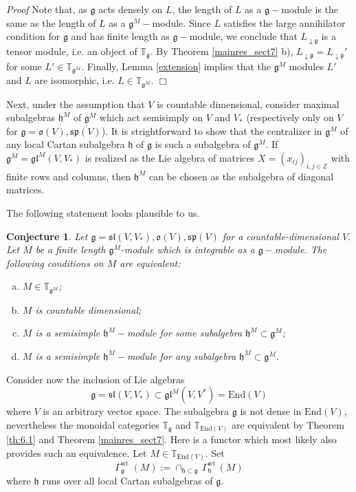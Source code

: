 \documentclass{svmult}
\newtheorem{conject}[theo]{Conjecture}
\renewenvironment{proof}{ \emph{Proof}}{$\Box$}
\newcommand {\ZZ} {\mathbb {Z}}
\newcommand{\TT}{\mathbb{T}}
\newcommand{\wt}{\mathrm{wt}}
\renewcommand{\sp}{\mathfrak{sp}}
\renewcommand{\sl}{\mathfrak{sl}}
\newcommand{\oo}{\mathfrak{o}}
\newcommand{\hh}{\mathfrak{h}}
\renewcommand{\gg}{\mathfrak{g}}
\newcommand{\gl}{\mathfrak{gl}}
\newcommand{\End}{\mathrm{End}}
\begin{document}
\begin{proof}
Note that, as $\gg$ acts densely on $L$, the length of $L$ as a $\gg-$module is the same as the length of $L$ as a $\gg^M-$module. 
Since $L$ satisfies  the large annihilator condition for $\gg$ and has finite length as $\gg-$module, we conclude that $L_{\downarrow\gg}$ is a tensor module, i.e. 
an object of $\TT_\gg$. By Theorem \ref{mainres_sect7} b), $L_{\downarrow\gg} = L_{\downarrow\gg}'$ for some $L' \in \TT_{\gg^M}$. Finally, Lemma \ref{extension} implies that the $\gg^M$ modules $L'$ and $L$ are isomorphic, i.e. $L\in\TT_{\gg^M}$.
\end{proof}
\vspace{0.33cm}

Next, under the assumption that $V$ is countable dimensional, consider maximal subalgebras $\hh^M$ of $\gg^M$ which act semisimply on $V$ and $V_*$ (respectively only on $V$ for $\gg = \oo(V), \sp(V)$). 
It is strightforward to show that the centralizer in $\gg^M$ of any local Cartan subalgebra $\hh$ of $\gg$ is such a subalgebra of $\gg^M$. 
If $\gg^M = \gl^M(V,V_*)$ is realized as the Lie algebra of matrices $X = (x_{ij})_{i,j \in \ZZ}$ with finite rows and columns, then $\hh^M$ can 
be chosen as the subalgebra of diagonal matrices.

The following statement looks plausible to us.

\begin{conject}\label{conject:1}
Let $\gg = \sl(V,V_*), \oo(V), \sp(V)$ for a countable-dimensional $V$. Let $M$ be a finite length $\gg^M$-module which is integrable as a $\gg-$module. The following conditions on $M$ are equivalent:
\begin{enumerate}[a)]
 \item $M \in \TT_{\gg^M}$;
 \item $M$ is countable dimensional;
 \item $M$ is a semisimple $\hh^M-$module for some subalgebra $\hh^M\subset \gg^M$;
  \item $M$ is a semisimple $\hh^M-$module for any subalgebra $\hh^M \subset \gg^M$.
\end{enumerate}

\end{conject} 

\vspace{0.4cm}

Consider now the inclusion of Lie algebras 
$$\gg = \sl(V,V_*) \subset \gl^M(V,V^*) = \End(V)$$
where $V$ is an arbitrary vector space. The subalgebra $\gg$ is not dense in $\End(V)$, nevertheless the monoidal categories $\TT_{\gg}$ and $\TT_{\End(V)}$ are equivalent by Theorem \ref{th:6.1} and Theorem \ref{mainres_sect7}. Here is a functor which most likely also provides such an equivalence. Let $M \in \TT_{\End(V)}$. Set 
$$\Gamma_{\gg}^\wt \;(M) := \cap_{\hh \subset \gg}\,\Gamma_{\hh}^\wt\,(M)$$
where $\hh$ runs over all local Cartan subalgebras of $\gg$.
\end{document}
